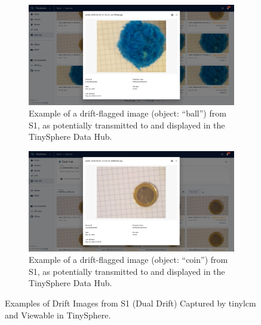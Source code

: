 \begin{figure}[htbp]
    \centering
    \begin{subfigure}{0.49\textwidth}
        \centering
        \includegraphics[width=\textwidth]{figs/evaluation/drift_image_exp1_ball.png}
        \caption[Example Drift Image of ``Ball'' (S1)]{Example of a drift-flagged image (object: ``ball'') from  S1, as potentially transmitted to and displayed in the TinySphere Data Hub.}
        \label{fig:drift-image-ball_s1}
    \end{subfigure}
    \hfill 
    \begin{subfigure}{0.49\textwidth}
        \centering
        \includegraphics[width=\textwidth]{figs/evaluation/drift_image_exp1_coin.png}
        \caption[Example Drift Image of ``Coin'' (S1)]{Example of a drift-flagged image (object: ``coin'') from  S1, as potentially transmitted to and displayed in the TinySphere Data Hub.}
        \label{fig:drift-image-coin_s1}
    \end{subfigure}
    \caption[Drift Images from S1 (Dual Drift)]{Examples of Drift Images from S1 (Dual Drift) Captured by \gls{tinylcm} and Viewable in TinySphere.}
    \label{fig:combined-drift-images-s1}
\end{figure}


